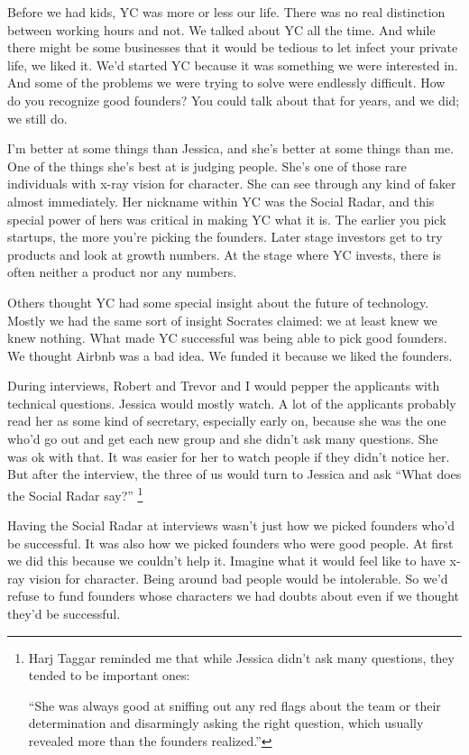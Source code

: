 Before we had kids, YC was more or less our life. There was no real
distinction between working hours and not. We talked about YC all the
time. And while there might be some businesses that it would be tedious
to let infect your private life, we liked it. We'd started YC because it
was something we were interested in. And some of the problems we were
trying to solve were endlessly difficult. How do you recognize good
founders? You could talk about that for years, and we did; we still do.

I'm better at some things than Jessica, and she's better at some things
than me. One of the things she's best at is judging people. She's one of
those rare individuals with x-ray vision for character. She can see
through any kind of faker almost immediately. Her nickname within YC was
the Social Radar, and this special power of hers was critical in making
YC what it is. The earlier you pick startups, the more you're picking
the founders. Later stage investors get to try products and look at
growth numbers. At the stage where YC invests, there is often neither a
product nor any numbers.

Others thought YC had some special insight about the future of
technology. Mostly we had the same sort of insight Socrates claimed: we
at least knew we knew nothing. What made YC successful was being able to
pick good founders. We thought Airbnb was a bad idea. We funded it
because we liked the founders.

During interviews, Robert and Trevor and I would pepper the applicants
with technical questions. Jessica would mostly watch. A lot of the
applicants probably read her as some kind of secretary, especially early
on, because she was the one who'd go out and get each new group and she
didn't ask many questions. She was ok with that. It was easier for her
to watch people if they didn't notice her. But after the interview, the
three of us would turn to Jessica and ask ``What does the Social Radar
say?'' \footnote{Harj Taggar reminded me that while Jessica didn't ask many
questions, they tended to be important ones:

``She was always good at sniffing out any red flags about the team or
their determination and disarmingly asking the right question, which
usually revealed more than the founders realized.''}

Having the Social Radar at interviews wasn't just how we picked founders
who'd be successful. It was also how we picked founders who were good
people. At first we did this because we couldn't help it. Imagine what
it would feel like to have x-ray vision for character. Being around bad
people would be intolerable. So we'd refuse to fund founders whose
characters we had doubts about even if we thought they'd be successful.

